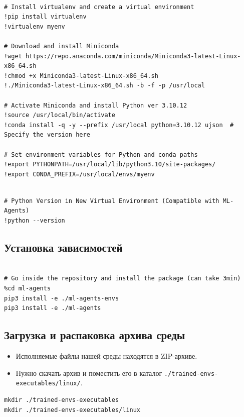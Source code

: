 \documentclass[11pt,a4paper]{article}
\begin{document}
\begin{lstlisting}

# Install virtualenv and create a virtual environment
!pip install virtualenv
!virtualenv myenv

# Download and install Miniconda
!wget https://repo.anaconda.com/miniconda/Miniconda3-latest-Linux-x86_64.sh
!chmod +x Miniconda3-latest-Linux-x86_64.sh
!./Miniconda3-latest-Linux-x86_64.sh -b -f -p /usr/local

# Activate Miniconda and install Python ver 3.10.12
!source /usr/local/bin/activate
!conda install -q -y --prefix /usr/local python=3.10.12 ujson  # Specify the version here

# Set environment variables for Python and conda paths
!export PYTHONPATH=/usr/local/lib/python3.10/site-packages/
!export CONDA_PREFIX=/usr/local/envs/myenv
\end{lstlisting}

\begin{lstlisting}

# Python Version in New Virtual Environment (Compatible with ML-Agents)
!python --version
\end{lstlisting}

\subsection{Установка зависимостей}\label{installing-the-dependencies}

\begin{lstlisting}

# Go inside the repository and install the package (can take 3min)
%cd ml-agents
pip3 install -e ./ml-agents-envs
pip3 install -e ./ml-agents
\end{lstlisting}

\subsection{Загрузка и распаковка архива среды}\label{download-and-move-the-environment-zip-file-in-.trained-envs-executableslinux}

\begin{itemize}
\tightlist
\item
  Исполняемые файлы нашей среды находятся в ZIP-архиве.
\item
  Нужно скачать архив и поместить его в каталог \texttt{./trained-envs-executables/linux/}.
\end{itemize}

\begin{lstlisting}
mkdir ./trained-envs-executables
mkdir ./trained-envs-executables/linux
\end{lstlisting}
\end{document}
